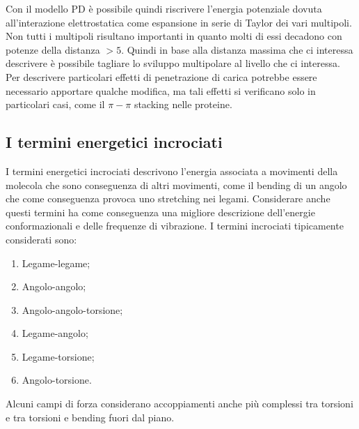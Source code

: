 \documentclass[oneside]{amsbook}
\numberwithin{section}{chapter}
\numberwithin{equation}{section}
\numberwithin{figure}{section}
\begin{document}
Con il modello PD è possibile quindi riscrivere l'energia potenziale dovuta all'interazione elettrostatica come espansione in serie di Taylor  dei vari multipoli. Non tutti i multipoli risultano importanti in quanto molti di essi decadono con potenze della distanza $>5$. Quindi in base alla distanza massima che ci interessa descrivere è possibile tagliare lo sviluppo multipolare al livello  che ci interessa.
Per descrivere particolari effetti di penetrazione di carica potrebbe essere necessario apportare qualche modifica, ma tali effetti si verificano solo in particolari casi, come il $\pi -\pi$ stacking nelle proteine.

\subsection{I termini energetici incrociati}
I termini energetici incrociati descrivono l'energia associata a movimenti della molecola che sono conseguenza di altri movimenti, come il bending di un angolo che come conseguenza provoca uno stretching nei legami. Considerare anche questi termini ha come conseguenza una migliore descrizione dell'energie conformazionali e delle frequenze di vibrazione.
I termini incrociati tipicamente considerati sono:
\begin{enumerate}
\item Legame-legame;
\item Angolo-angolo;
\item Angolo-angolo-torsione;
\item Legame-angolo;
\item Legame-torsione;
\item Angolo-torsione.
\end{enumerate}
Alcuni campi di forza considerano accoppiamenti anche più complessi tra torsioni e tra torsioni e bending fuori dal piano.
\end{document}
